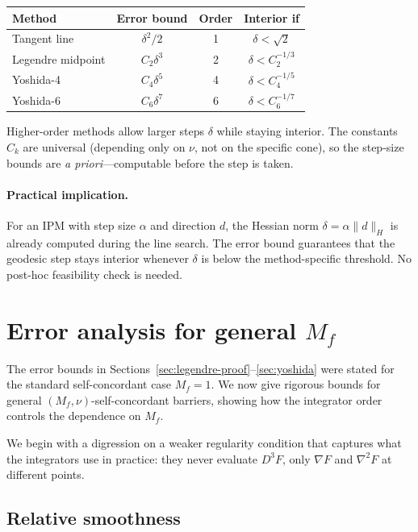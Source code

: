 \documentclass[11pt]{article}
\begin{document}
\begin{center}
\renewcommand{\arraystretch}{1.2}
\begin{tabular}{@{}lccc@{}}
\toprule
\textbf{Method} & \textbf{Error bound} & \textbf{Order} & \textbf{Interior if} \\
\midrule
Tangent line      & $\delta^2/2$       & 1 & $\delta < \sqrt{2}$ \\
Legendre midpoint  & $C_2 \delta^3$     & 2 & $\delta < C_2^{-1/3}$ \\
Yoshida-4         & $C_4 \delta^5$     & 4 & $\delta < C_4^{-1/5}$ \\
Yoshida-6         & $C_6 \delta^7$     & 6 & $\delta < C_6^{-1/7}$ \\
\bottomrule
\end{tabular}
\end{center}
Higher-order methods allow larger steps $\delta$ while staying
interior.  The constants $C_k$ are universal (depending only on $\nu$,
not on the specific cone), so the step-size bounds are
\emph{a priori}---computable before the step is taken.

\paragraph{Practical implication.}
For an IPM with step size $\alpha$ and direction $d$, the Hessian
norm $\delta = \alpha\|d\|_H$ is already computed during the line
search.  The error bound guarantees that the geodesic step stays
interior whenever $\delta$ is below the method-specific threshold.
No post-hoc feasibility check is needed.

\section{Error analysis for general $M_f$}
\label{sec:rel-smooth}

The error bounds in Sections~\ref{sec:legendre-proof}--\ref{sec:yoshida}
were stated for the standard self-concordant case $M_f = 1$.  We now
give rigorous bounds for general $(M_f, \nu)$-self-concordant barriers,
showing how the integrator order controls the dependence on $M_f$.

We begin with a digression on a weaker regularity condition that
captures what the integrators use in practice: they never evaluate
$D^3 F$, only $\nabla F$ and $\nabla^2 F$ at different points.

\subsection{Relative smoothness}
\end{document}
